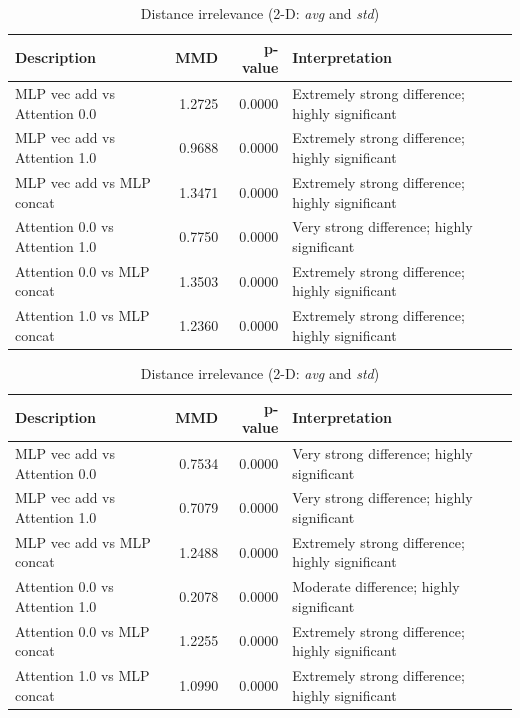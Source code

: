 \documentclass{article} %
\theoremstyle{plain}
\theoremstyle{definition}
\newtheorem{empirical fact}[theorem]{Empirical Fact}
\begin{document}
\begin{table}[t][h]
\centering
\caption{Permutation–test MMDs on the empirical gradient symmetricity and distance irrelevance distributions across all architectures.  
All p-values are $\le 10^{-6}$ (reported as 0.0000).}
\vspace{0.5em}

\begin{subtable}[t]{\textwidth}
\centering
\caption{Gradient symmetricity (2-D: \textit{avg} and \textit{std})}
\begin{tabular}{lrrl}
\toprule
Description & MMD & p-value & Interpretation \\
\midrule
MLP vec add vs Attention 0.0 & 1.2725 & 0.0000 & Extremely strong difference; highly significant \\
MLP vec add vs Attention 1.0 & 0.9688 & 0.0000 & Extremely strong difference; highly significant \\
MLP vec add vs MLP concat    & 1.3471 & 0.0000 & Extremely strong difference; highly significant \\
Attention 0.0 vs Attention 1.0 & 0.7750 & 0.0000 & Very strong difference; highly significant \\
Attention 0.0 vs MLP concat    & 1.3503 & 0.0000 & Extremely strong difference; highly significant \\
Attention 1.0 vs MLP concat    & 1.2360 & 0.0000 & Extremely strong difference; highly significant \\
\bottomrule
\end{tabular}
\end{subtable}

\vspace{0.75em}

\begin{subtable}[t]{\textwidth}
\centering
\caption{Distance irrelevance (2-D: \textit{avg} and \textit{std})}
\begin{tabular}{lrrl}
\toprule
Description & MMD & p-value & Interpretation \\
\midrule
MLP vec add vs Attention 0.0 & 0.7534 & 0.0000 & Very strong difference; highly significant \\
MLP vec add vs Attention 1.0 & 0.7079 & 0.0000 & Very strong difference; highly significant \\
MLP vec add vs MLP concat    & 1.2488 & 0.0000 & Extremely strong difference; highly significant \\
Attention 0.0 vs Attention 1.0 & 0.2078 & 0.0000 & Moderate difference; highly significant \\
Attention 0.0 vs MLP concat    & 1.2255 & 0.0000 & Extremely strong difference; highly significant \\
Attention 1.0 vs MLP concat    & 1.0990 & 0.0000 & Extremely strong difference; highly significant \\
\bottomrule
\end{tabular}
\end{subtable}

\end{table}
\end{document}
